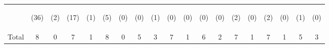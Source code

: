 \begin{tabular}{lcccccccccccccccccc}
 & \begin{footnotesize}(36)\end{footnotesize} & \begin{footnotesize}(2)\end{footnotesize} & \begin{footnotesize}(17)\end{footnotesize} & \begin{footnotesize}(1)\end{footnotesize} & \begin{footnotesize}(5)\end{footnotesize} & \begin{footnotesize}(0)\end{footnotesize} & \begin{footnotesize}(0)\end{footnotesize} & \begin{footnotesize}(1)\end{footnotesize} & \begin{footnotesize}(0)\end{footnotesize} & \begin{footnotesize}(0)\end{footnotesize} & \begin{footnotesize}(0)\end{footnotesize} & \begin{footnotesize}(0)\end{footnotesize} & \begin{footnotesize}(2)\end{footnotesize} & \begin{footnotesize}(0)\end{footnotesize} & \begin{footnotesize}(2)\end{footnotesize} & \begin{footnotesize}(0)\end{footnotesize} & \begin{footnotesize}(1)\end{footnotesize} & \begin{footnotesize}(0)\end{footnotesize}\\
\noalign{\smallskip}Total & 8 & 0 & 7 & 1 & 8 & 0 & 5 & 3 & 7 & 1 & 6 & 2 & 7 & 1 & 7 & 1 & 5 & 3\\

\end{tabular}
